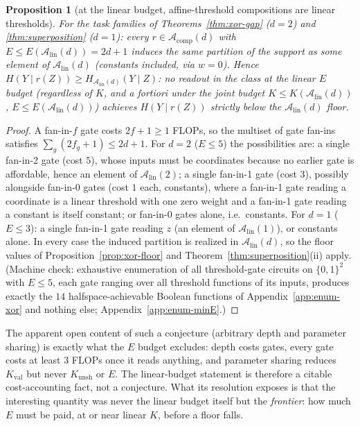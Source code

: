 \documentclass[twocolumn,10pt]{article}
\newtheorem{proposition}[theorem]{Proposition}
\theoremstyle{definition}
\theoremstyle{remark}
\newcommand{\cA}{\mathcal{A}}
\newcommand{\Alin}{\cA_{\mathrm{lin}}}
\newcommand{\Kunsh}{K_{\mathrm{unsh}}}
\newcommand{\Kval}{K_{\mathrm{val}}}
\begin{document}
\begin{proposition}[at the linear budget, affine-threshold compositions
are linear thresholds]
\label{prop:budget-trivial}
For the task families of Theorems~\ref{thm:xor-gap} ($d = 2$) and
\ref{thm:superposition} ($d = 1$): every $r \in \cA_{\mathrm{comp}}(d)$
with $E \le E(\Alin(d)) = 2d + 1$ induces the same partition of the
support as some element of $\Alin(d)$ (constants included, via $w = 0$).
Hence $H(Y \mid r(Z)) \ge H_{\Alin(d)}(Y \mid Z)$: no readout in the
class at the linear $E$ budget (regardless of $K$, and a fortiori
under the joint budget $K \le K(\Alin(d))$, $E \le E(\Alin(d))$)
achieves $H(Y \mid r(Z))$ strictly below the $\Alin(d)$ floor.
\end{proposition}

\begin{proof}
A fan-in-$f$ gate costs $2f + 1 \ge 1$ FLOPs, so the multiset of gate
fan-ins satisfies $\sum_g (2 f_g + 1) \le 2d + 1$. For $d = 2$
($E \le 5$) the possibilities are: a single fan-in-2 gate (cost $5$),
whose inputs must be coordinates because no earlier gate is affordable,
hence an element of $\Alin(2)$; a single fan-in-1 gate (cost $3$),
possibly alongside fan-in-0 gates (cost $1$ each, constants), where a
fan-in-1 gate reading a coordinate is a linear threshold with one zero
weight and a fan-in-1 gate reading a constant is itself constant; or
fan-in-0 gates alone, i.e.\ constants. For $d = 1$ ($E \le 3$): a single fan-in-1 gate
reading $z$ (an element of $\Alin(1)$), or constants alone. In every case
the induced partition is realized in $\Alin(d)$, so the floor values of
Proposition~\ref{prop:xor-floor} and
Theorem~\ref{thm:superposition}(ii) apply. (Machine check: exhaustive
enumeration of all threshold-gate circuits on $\{0,1\}^2$ with $E \le 5$,
each gate ranging over all threshold functions of its inputs, produces
exactly the $14$ halfspace-achievable Boolean functions of
Appendix~\ref{app:enum-xor} and nothing else;
Appendix~\ref{app:enum-minE}.)
\end{proof}

The apparent open content of such a conjecture (arbitrary depth
and parameter sharing) is exactly what the $E$ budget excludes: depth
costs gates, every gate costs at least $3$ FLOPs once it reads anything,
and parameter sharing reduces $\Kval$ but never $\Kunsh$ or $E$. The
linear-budget
statement is therefore a citable cost-accounting fact, not a conjecture.
What its resolution exposes is that the interesting quantity was never
the linear budget itself but the \emph{frontier}: how much $E$ must be
paid, at or near linear $K$, before a floor falls.
\end{document}
